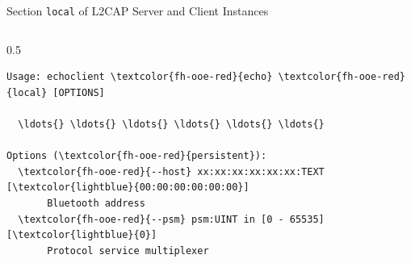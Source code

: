 \begin{frame}[fragile]{Section \alert{\lstinline|local|} of L2CAP Server and Client Instances}
\begin{columns}[T, onlytextwidth]
\begin{column}{0.5\textwidth}
\begin{scriptsize}
\begin{Verbatim}[commandchars=\\\{\},frame=leftline,rulecolor=\color{fh-ooe-red}]
Usage: echoclient \textcolor{fh-ooe-red}{echo} \textcolor{fh-ooe-red}{local} [OPTIONS]

  \ldots{} \ldots{} \ldots{} \ldots{} \ldots{} \ldots{}

Options (\textcolor{fh-ooe-red}{persistent}):
  \textcolor{fh-ooe-red}{--host} xx:xx:xx:xx:xx:xx:TEXT [\textcolor{lightblue}{00:00:00:00:00:00}]
       Bluetooth address
  \textcolor{fh-ooe-red}{--psm} psm:UINT in [0 - 65535] [\textcolor{lightblue}{0}]
       Protocol service multiplexer
\end{Verbatim}
\end{scriptsize}
\end{column}
\end{columns}
\end{frame}
